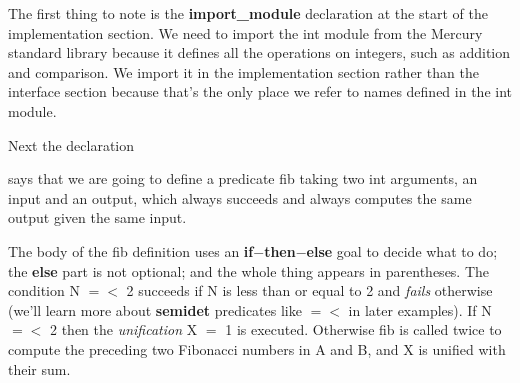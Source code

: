 \documentclass[a4paper,11pt,notitlepage,onecolumn]{book}
\begin{document}
The first thing to note is the \textsf{\textbf{import\_module}} declaration at the start
of the implementation section.  We need to import the \textsf{int} module from the
Mercury standard library because it defines all the operations on integers,
such as addition and comparison.  We import it in the implementation
section rather than the interface section because that's the only place we
refer to names defined in the \textsf{int} module.

Next the declaration
\begin{small}

\begin{ptabular}
\nextline
\end{ptabular}

\end{small}
says that we are going to define a predicate \textsf{fib} taking two \textsf{int}
arguments, an input and an output, which always succeeds and always
computes the same output given the same input.
\begin{small}

\begin{ptabular}
\nextline
{}
\nextline
{}
\nextline
{}
\nextline
{}
\nextline
\end{ptabular}

\end{small}
The body of the \textsf{fib} definition uses an \textsf{\textbf{if}{\ensuremath{-}}\textbf{then}{\ensuremath{-}}\textbf{else}} goal to decide what
to do; the \textsf{\textbf{else}} part is not optional; and the whole thing appears in
parentheses.  The condition \textsf{N {\ensuremath{=}}{\ensuremath{<}} 2} succeeds if \textsf{N} is less than or equal
to 2 and \emph{fails} otherwise (we'll learn more about \textsf{\textbf{semidet}} predicates
like \textsf{{\ensuremath{=}}{\ensuremath{<}}} in later examples).  If \textsf{N {\ensuremath{=}}{\ensuremath{<}} 2} then the
\emph{unification} \textsf{X {\ensuremath{=}} 1} is executed.  Otherwise \textsf{fib} is called twice to
compute the preceding two Fibonacci numbers in \textsf{A} and \textsf{B}, and \textsf{X}
is unified with their sum.
\end{document}
